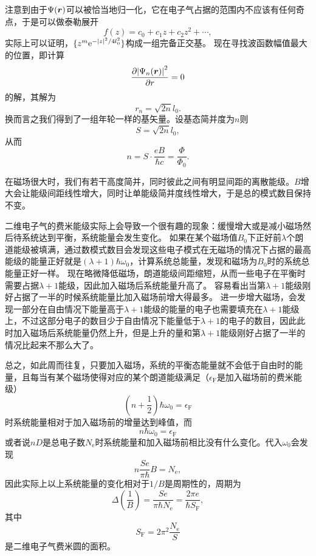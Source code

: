 注意到由于$\Psi(\vb*{r})$可以被恰当地归一化，它在电子气占据的范围内不应该有任何奇点，于是可以做泰勒展开
\[
    f(z) = c_0 + c_1 z + c_2 z^2 + \cdots,
\]
实际上可以证明，$\{z^m \mathrm{e}^{- \abs{z}^2 / 4 l_0^2}\}$构成一组完备正交基。
现在寻找波函数幅值最大的位置，即计算
\[
    \pdv{\abs{\Psi_n(\vb*{r})}^2}{r} = 0
\]
的解，其解为
\[
    r_n = \sqrt{2n} l_0.
\]
换而言之我们得到了一组年轮一样的基矢量。设基态简并度为$n$则
\[
    S = \sqrt{2n} l_0,
\]
从而
\[
    n = S \cdot \frac{eB}{\hbar c} = \frac{\Phi}{\Phi_0}.
\]

在磁场很大时，我们有若干高度简并，同时彼此之间有明显间距的离散能级。$B$增大会让能级间距线性增大，同时让单能级简并度线性增大，于是总的模式数目保持不变。

二维电子气的费米能级实际上会导致一个很有趣的现象：缓慢增大或是减小磁场然后待系统达到平衡，系统能量会发生变化。
如果在某个磁场值$B_0$下正好前$\lambda$个朗道能级被填满，通过数模式数目会发现这些电子模式在无磁场的情况下占据的最高能级的能量正好就是$(\lambda + 1) \hbar \omega_0$，计算系统总能量，发现和磁场为$B_0$时的系统总能量正好一样。
现在略微降低磁场，朗道能级间距缩短，从而一些电子在平衡时需要占据$\lambda+1$能级，因此加入磁场后系统能量升高了。
容易看出当第$\lambda+1$能级刚好占据了一半的时候系统能量比加入磁场前增大得最多。
进一步增大磁场，会发现一部分在自由情况下能量高于$\lambda+1$能级的能量的电子也需要填充在$\lambda+1$能级上，不过这部分电子的数目少于自由情况下能量低于$\lambda+1$的电子的数目，因此此时加入磁场后系统能量仍然上升，但是上升的量和第$\lambda+1$能级刚好占据了一半的情况比起来不那么大了。

总之，如此周而往复，只要加入磁场，系统的平衡态能量就不会低于自由时的能量，且每当有某个磁场使得对应的某个朗道能级满足（$\epsilon_\text{F}$是加入磁场前的费米能级）
\begin{equation}
    \left( n + \frac{1}{2} \right) \hbar \omega_0 = \epsilon_\text{F}
\end{equation}
时系统能量相对于加入磁场前的增量达到峰值，而
\begin{equation}
    n \hbar \omega_0 = \epsilon_\text{F}
\end{equation}
或者说$n D$是总电子数$N_\text{e}$时系统能量和加入磁场前相比没有什么变化。代入$\omega_0$会发现
\[
    n \frac{S e}{\pi \hbar} B = N_\text{e},
\]
因此实际上以上系统能量的变化相对于$1/B$是周期性的，周期为
\begin{equation}
    \Delta\left(\frac{1}{B}\right) = \frac{Se}{\pi \hbar N_\text{e}} = \frac{2\pi e}{\hbar S_\text{F}},
    \label{eq:de-hass-van-alphen-period}
\end{equation}
其中
\begin{equation}
    S_\text{F} = 2 \pi^2 \frac{N_\text{e}}{S}
\end{equation}
是二维电子气费米圆的面积。

